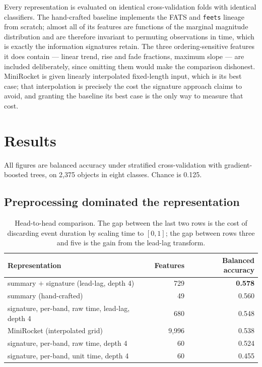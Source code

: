 \documentclass[11pt,a4paper]{report}
\begin{document}
Every representation is evaluated on identical cross-validation folds with identical
classifiers. The hand-crafted baseline implements the FATS and \texttt{feets} lineage from
scratch; almost all of its features are functions of the marginal magnitude distribution and
are therefore invariant to permuting observations in time, which is exactly the information
signatures retain. The three ordering-sensitive features it does contain --- linear trend, rise
and fade fractions, maximum slope --- are included deliberately, since omitting them would make
the comparison dishonest. MiniRocket is given linearly interpolated fixed-length input, which
is its best case; that interpolation is precisely the cost the signature approach claims to
avoid, and granting the baseline its best case is the only way to measure that cost.

\section{Results}

All figures are balanced accuracy under stratified cross-validation with gradient-boosted
trees, on 2{,}375 objects in eight classes. Chance is 0.125.

\subsection{Preprocessing dominated the representation}

\begin{table}[h]
\centering
\small
\begin{tabular}{lrr}
\toprule
Representation & Features & Balanced accuracy \\
\midrule
summary $+$ signature (lead-lag, depth 4) & 729 & \textbf{0.578} \\
summary (hand-crafted) & 49 & 0.560 \\
signature, per-band, raw time, lead-lag, depth 4 & 680 & 0.548 \\
MiniRocket (interpolated grid) & 9{,}996 & 0.538 \\
signature, per-band, raw time, depth 4 & 60 & 0.524 \\
signature, per-band, unit time, depth 4 & 60 & 0.455 \\
\bottomrule
\end{tabular}
\caption{Head-to-head comparison. The gap between the last two rows is the cost of
discarding event duration by scaling time to $[0,1]$; the gap between rows three and five
is the gain from the lead-lag transform.}
\end{table}
\end{document}
